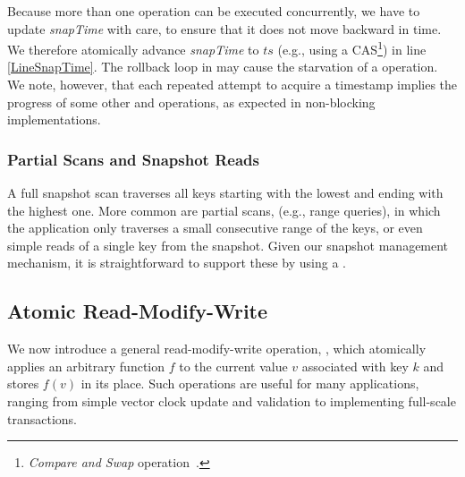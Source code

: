 
Because more than one   operation can be executed concurrently,
we have to update  \emph{snapTime}  with care, to ensure that it does not move backward in time.
We therefore atomically advance \emph{snapTime} to $ts$ 
(e.g., using a CAS\footnote{\emph{Compare and Swap} operation~\cite{Herlihy2008}.}) in line \ref{LineSnapTime}.
%
The rollback loop in  may cause the starvation of a 
operation. We note, however, that each repeated attempt to acquire a timestamp
implies the progress of some other  and  operations, as expected in non-blocking
implementations.

\subsubsection{Partial Scans and Snapshot Reads}
\label{se:range}

A full snapshot scan traverses
all keys starting with the lowest and ending with the highest one. More common
are partial scans, (e.g., range queries),
in which the application only traverses a small consecutive range of the keys,
or even simple reads of a single key from the snapshot.
Given our snapshot management mechanism, it is straightforward to support these by using
a .

\subsection{Atomic Read-Modify-Write}
\label{Se:RMW}

We now introduce a general read-modify-write operation, , which atomically applies an
arbitrary function $f$ to the current value $v$ associated with key $k$ and stores $f(v)$
in its place.
Such operations are  useful for many applications, ranging from simple vector clock update and validation to implementing full-scale transactions.

